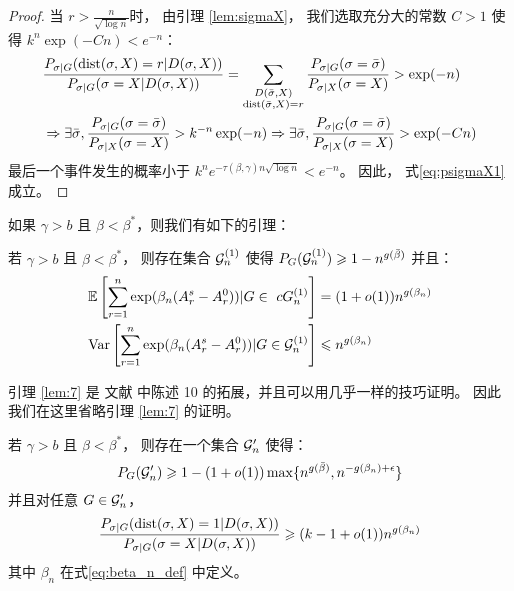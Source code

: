 \begin{proof}
  当 $r>\frac{n}{\sqrt{\log n}}$时，
  由引理 \ref{lem:sigmaX}，
  我们选取充分大的常数  $C>1$
  使得 $k^n\exp(-Cn) < e^{-n}$：
  \begin{align*}
  &\frac{P_{\sigma|G}(\operatorname{dist}(\sigma, X)=r | D(\sigma, X))}
  {P_{\sigma|G}(\sigma=X | D(\sigma, X))} = 
  \sum_{\substack{D(\bar{\sigma}, X) \\ 
  \operatorname{dist}(\bar{\sigma}, X)=r}} \frac{P_{\sigma | G}(\sigma = \bar{\sigma}) }{P_{\sigma | X}(\sigma = X)} > \exp(-n)\\
  &\Rightarrow \exists \bar{\sigma},
  \frac{P_{\sigma | G}(\sigma = \bar{\sigma}) }{P_{\sigma | X}(\sigma = X)} > k^{-n}\exp(-n)
  \Rightarrow \exists \bar{\sigma},
  \frac{P_{\sigma | G}(\sigma = \bar{\sigma}) }{P_{\sigma | X}(\sigma = X)} > \exp(-Cn)\\
  \end{align*}
  最后一个事件发生的概率小于 $k^ne^{-\tau(\beta, \gamma) n\sqrt{\log n}}<e^{-n}$。
  因此，    式\eqref{eq:psigmaX1}成立。
  \end{proof}

  如果 $\gamma > b$ 且 $\beta < \beta^*$，则我们有如下的引理：
 \begin{lemma}\label{lem:7}
	若 $\gamma > b$ 且 $\beta < \beta^*$，
  则存在集合 $\mathcal{G}^{(1)}_n$ 使得
	$P_G(\mathcal{G}^{(1)}_n) \geqslant 1-n^{g(\bar{\beta})}$
	并且：
 \begin{align}
	\mathbb{E}\left[
    \sum_{r=1}^n \exp(\beta_n (A_r^s - A_r^0)) | G \in \   cG^{(1)}_n\right] &= (1+o(1))n^{g(\beta_n)} \\
	\operatorname{\mathrm{Var}} \left[
    \sum_{r=1}^n \exp(\beta_n (A_r^s - A_r^0)) | G \in \mathcal{G}^{(1)}_n
    \right] &\leqslant n^{g(\beta_n)}
	\end{align}
\end{lemma}
引理 \ref{lem:7} 是 文献  中陈述 10 
的拓展，并且可以用几乎一样的技巧证明。
因此我们在这里省略引理 \ref{lem:7} 的证明。

\begin{lemma}\label{prop:large2}
	若 $\gamma > b$ 且 $\beta < \beta^*$，
 则存在一个集合 $\mathcal{G}'_n$ 使得：
\begin{equation}
	P_G(\mathcal{G}'_n) \geqslant 1 - (1+o(1))\max\{n^{g(\bar{\beta})}, n^{- g(\beta_n) + \epsilon} \}
	\end{equation}
	并且对任意 $G \in \mathcal{G}'_n$，
\begin{equation}\label{eq:diff1g}
	\frac{P_{\sigma|G}(\operatorname{dist}(\sigma, X)=1 | D(\sigma, X))}
	{P_{\sigma|G}(\sigma=X | D(\sigma, X))} \geqslant (k-1+o(1))n^{g(\beta_n)}
	\end{equation}
  其中 $\beta_n$ 在式\eqref{eq:beta_n_def} 中定义。
\end{lemma}

